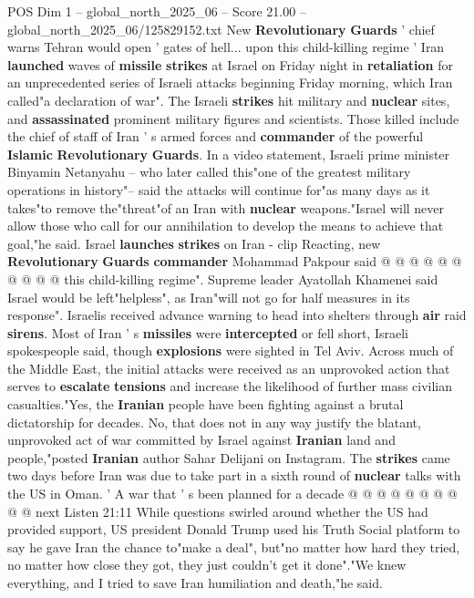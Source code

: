 \begin{textsample}{POS Dim 1 – global\_north\_2025\_06 – Score 21.00 – global\_north\_2025\_06/125829152.txt}  \label{ex:f1_pos_336}
New \textbf{Revolutionary} \textbf{Guards} ' chief warns Tehran would open ' gates of hell... upon this child-killing regime ' Iran \textbf{launched} waves of \textbf{missile} \textbf{strikes} at Israel on Friday night in \textbf{retaliation} for an unprecedented series of Israeli attacks beginning Friday morning, which Iran called"a declaration of war".
The Israeli \textbf{strikes} hit military and \textbf{nuclear} sites, and \textbf{assassinated} prominent military figures and scientists.
Those killed include the chief of staff of Iran ' s armed forces and \textbf{commander} of the powerful \textbf{Islamic} \textbf{Revolutionary} \textbf{Guards}.
In a video statement, Israeli prime minister Binyamin Netanyahu -- who later called this"one of the greatest military operations in history"-- said the attacks will continue for"as many days as it takes"to remove the"threat"of an Iran with \textbf{nuclear} weapons."Israel will never allow those who call for our annihilation to develop the means to achieve that goal,"he said.
Israel \textbf{launches} \textbf{strikes} on Iran - clip Reacting, new \textbf{Revolutionary} \textbf{Guards} \textbf{commander} Mohammad Pakpour said @ @ @ @ @ @ @ @ @ @ this child-killing regime".
Supreme leader Ayatollah Khamenei said Israel would be left"helpless", as Iran"will not go for half measures in its response".
Israelis received advance warning to head into shelters through \textbf{air} raid \textbf{sirens}.
Most of Iran ' s \textbf{missiles} were \textbf{intercepted} or fell short, Israeli spokespeople said, though \textbf{explosions} were sighted in Tel Aviv.
Across much of the Middle East, the initial attacks were received as an unprovoked action that serves to \textbf{escalate} \textbf{tensions} and increase the likelihood of further mass civilian casualties."Yes, the \textbf{Iranian} people have been fighting against a brutal dictatorship for decades.
No, that does not in any way justify the blatant, unprovoked act of war committed by Israel against \textbf{Iranian} land and people,"posted \textbf{Iranian} author Sahar Delijani on Instagram.
The \textbf{strikes} came two days before Iran was due to take part in a sixth round of \textbf{nuclear} talks with the US in Oman. ' A war that ' s been planned for a decade @ @ @ @ @ @ @ @ @ @ next Listen 21:11 While questions swirled around whether the US had provided support, US president Donald Trump used his Truth Social platform to say he gave Iran the chance to"make a deal", but"no matter how hard they tried, no matter how close they got, they just couldn't get it done"."We knew everything, and I tried to save Iran humiliation and death,"he said.

\end{textsample}
